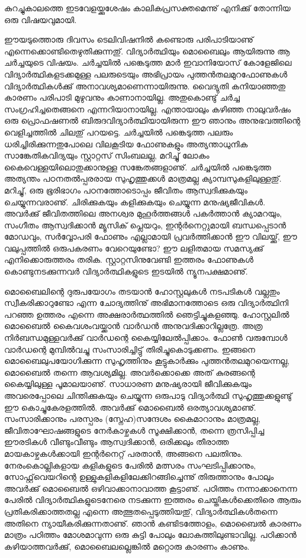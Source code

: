 ﻿
\vskip 2pt

കുറച്ചുകാലത്തെ ഇടവേളയ്ക്കുശേഷം കാലികപ്രസക്തമെന്നു് എനിക്കു് തോന്നിയ ഒരു വിഷയവുമായി.

ഈയടുത്തൊരു ദിവസം ടെലിവിഷനില്‍ കണ്ടൊരു പരിപാടിയാണു് എന്നെക്കൊണ്ടിതെഴുതിക്കുന്നതു്. 
വിദ്യാര്‍ത്ഥിയും മൊബൈലും ആയിരുന്നു ആ ചര്‍ച്ചയുടെ വിഷയം. ചര്‍ച്ചയില്‍ പങ്കെടുത്ത മാര്‍ ഇവാനിയോസ് കോളേജിലെ 
വിദ്യാര്‍ത്ഥികളടക്കമുള്ള പലരുടെയും അഭിപ്രായം പുത്തന്‍തലമുറഫോണുകള്‍ വിദ്യാര്‍ത്ഥികള്‍ക്കു് അനാവശ്യമാണെന്നായിരുന്നു.
 വൈദ്യുതി കനിയാഞ്ഞതു കാരണം പരിപാടി മുഴുവനും കാണാനായില്ല. അതുകൊണ്ടു് ചര്‍ച്ച സംഗ്രഹിച്ചതെങ്ങനെ
 എന്നറിയാനായില്ല. എന്തായാലും കഴിഞ്ഞ നാലുവര്‍ഷം ഒരു പ്രൊഫഷണല്‍ ബിരുദവിദ്യാര്‍ത്ഥിയായിരുന്ന 
ഈ ഞാനും അനുഭവത്തിന്റെ വെളിച്ചത്തില്‍ ചിലതു് പറയട്ടെ. ചര്‍ച്ചയില്‍ പങ്കെടുത്ത പലരും ധരിച്ചിരിക്കുന്നതുപോലെ 
വിലകൂടിയ ഫോണുകളും അത്യന്താധുനിക സാങ്കേതികവിദ്യയും സ്റ്റാറ്റസ് സിംബലല്ല, മറിച്ചു് ലോകം 
കൈവെള്ളയിലൊതുക്കാനുള്ള സങ്കേതങ്ങളാണു്. ചര്‍ച്ചയില്‍ പങ്കെടുത്ത അത്യന്തം പഠനതല്‍പ്പരരായ സുഹൃത്തുക്കള്‍ 
മാത്രമല്ല ക്യാമ്പസുകളിലുള്ളതു്. മറിച്ചു്, ഒരു ഭൂരിഭാഗം പഠനത്തോടൊപ്പം ജീവിതം ആസ്വദിക്കുകയും ചെയ്യുന്നവരാണു്. 
ചിരിക്കുകയും കളിക്കുകയും ചെയ്യുന്ന മനുഷ്യജീവികള്‍. അവര്‍ക്കു് ജീവിതത്തിലെ അനശ്വര മുഹൂര്‍ത്തങ്ങള്‍ പകര്‍ത്താന്‍ 
ക്യാമറയും, സംഗീതം ആസ്വദിക്കാന്‍ മ്യൂസിക് പ്ലെയറും, ഇന്റര്‍നെറ്റുമായി ബന്ധപ്പെടാന്‍ മോഡവും, സര്‍വ്വോപരി ഫോണും 
എല്ലാമായി പ്രവര്‍ത്തിക്കാന്‍ ഈ വിലയ്ക്കു്, ഈ വലുപ്പത്തില്‍ ഒരുപകരണം വേറെയുണ്ടോ? ഈ ലളിതമായ സമസ്യക്കു്
എനിക്കൊരുത്തരം തരിക. സ്റ്റാറ്റസിനുവേണ്ടി ഇത്തരം ഫോണുകള്‍ കൊണ്ടുനടക്കുന്നവര്‍ വിദ്യാര്‍ത്ഥികളുടെ ഇടയില്‍
 ന്യൂനപക്ഷമാണു്.

മൊബൈലിന്റെ ദുരുപയോഗം തടയാന്‍ ഹോസ്റ്റലുകള്‍ നടപടികള്‍ വല്ലതും സ്വീകരിക്കാറുണ്ടോ എന്ന ചോദ്യത്തിനു് 
അഭിമാനത്തോടെ ഒരു വിദ്യാര്‍ത്ഥിനി പറഞ്ഞ ഉത്തരം എന്നെ അക്ഷരാര്‍ത്ഥത്തില്‍ ഞെട്ടിച്ചുകളഞ്ഞു. ഹോസ്റ്റലില്‍ 
മൊബൈല്‍ കൈവശംവയ്ക്കാന്‍ വാര്‍ഡന്‍ അനുവദിക്കാറില്ലത്രേ. അത്ര നിര്‍ബന്ധമുള്ളവര്‍ക്കു് വാര്‍ഡന്റെ കൈയ്യിലേല്‍പ്പിക്കാം. 
ഫോണ്‍ വരുമ്പോള്‍ വാര്‍ഡന്റെ മുമ്പില്‍വച്ചു സംസാരിച്ചിട്ടു് തിരിച്ചുകൊടുക്കണം. ഇങ്ങനെ മൊബൈലുപയോഗിക്കുന്ന 
സുഹൃത്തിനും കൂട്ടുകാര്‍ക്കും പുത്തന്‍തലമുറയെന്നല്ല, മൊബൈല്‍ തന്നെ ആവശ്യമില്ല. അവര്‍ക്കൊക്കെ അത് കുരങ്ങന്റെ 
കൈയ്യിലുള്ള പൂമാലയാണു്. സാധാരണ മനുഷ്യരായി ജീവിക്കുകയും അവരെപ്പോലെ ചിന്തിക്കുകയും ചെയ്യുന്ന ഒരുപാടു 
വിദ്യാര്‍ത്ഥി സുഹൃത്തുക്കളുണ്ടു് ഈ കൊച്ചുകേരളത്തില്‍. അവര്‍ക്കു് മൊബൈല്‍ ഒരത്യാവശ്യമാണു്. സംസാരിക്കാനും 
പരസ്പരം (സ്നേഹ)സന്ദേശം കൈമാറാനും മാത്രമല്ല, ജീവിതാഘോഷങ്ങളുടെ നേര്‍കാഴ്ചകള്‍ സൂക്ഷിക്കാന്‍, തന്നെ 
ത്രസിപ്പിച്ച ഈരടികള്‍ വീണ്ടുംവീണ്ടും ആസ്വദിക്കാന്‍, ഒരിക്കലും തീരാത്ത മായകാഴ്ചകള്‍ക്കായി ഇന്റര്‍നെറ്റ് പരതാന്‍,
 അങ്ങനെ പലതിനും. നേരംകൊല്ലികളായ കളികളുടെ പേരില്‍ മത്സരം സംഘടിപ്പിക്കാനും, സോഫ്റ്റ്‌വെയറിന്റെ
 ഉള്ളുകളികളിലേക്കിറങ്ങിച്ചെന്നു് തിരുത്താനും പോലും അവര്‍ക്കു് മൊബൈല്‍ ഒഴിവാക്കാനാവാത്ത കൂട്ടാണു്. 
പഠിത്തം നന്നാക്കാനെന്ന പേരില്‍ വിദ്യാര്‍ത്ഥികളുടെനേരെ നടക്കുന്ന ഇത്തരം ചെയ്തികള്‍ക്കെതിരെ ആരും
 പ്രതികരിക്കാത്തതല്ല എന്നെ അത്ഭുതപ്പെടുത്തിയതു്, വിദ്യാര്‍ത്ഥികള്‍തന്നെ അതിനെ ന്യായീകരിക്കുന്നതാണു്. 
ഞാന്‍ കണ്ടിടത്തോളം, മൊബൈല്‍ കാരണം മാത്രം പഠിത്തം മോശമാവുന്ന ഒരു കുട്ടി പോലും ലോകത്തിലുണ്ടാവില്ല.
 പഠിക്കാന്‍ കഴിയാത്തവര്‍ക്കു്, മൊബൈലല്ലെങ്കില്‍ മറ്റൊരു കാരണം കാണും.


